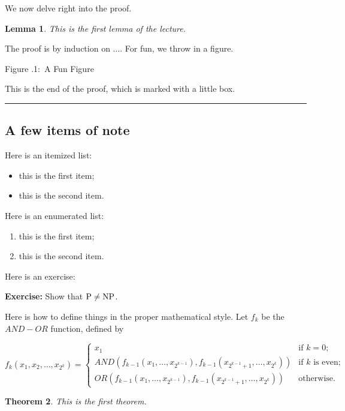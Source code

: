 \documentclass[twoside]{article}
\newcounter{lecnum}
\newcommand{\fig}[3]{
			\vspace{#2}
			\begin{center}
			Figure \thelecnum.#1:~#3
			\end{center}
	}
\newtheorem{theorem}{Theorem}[lecnum]
\newtheorem{lemma}[theorem]{Lemma}
\newenvironment{proof}{{\bf Proof:}}{\hfill\rule{2mm}{2mm}}
\begin{document}
We now delve right into the proof.

\begin{lemma}
This is the first lemma of the lecture.
\end{lemma}

\begin{proof}
The proof is by induction on $\ldots$.
For fun, we throw in a figure.
\fig{1}{1in}{A Fun Figure}

This is the end of the proof, which is marked with a little box.
\end{proof}

\subsection{A few items of note}

Here is an itemized list:
\begin{itemize}
\item this is the first item;
\item this is the second item.
\end{itemize}

Here is an enumerated list:
\begin{enumerate}
\item this is the first item;
\item this is the second item.
\end{enumerate}

Here is an exercise:

{\bf Exercise:}  Show that ${\rm P}\ne{\rm NP}$.

Here is how to define things in the proper mathematical style.
Let $f_k$ be the $AND-OR$ function, defined by

\[ f_k(x_1, x_2, \ldots, x_{2^k}) = \left\{ \begin{array}{ll}

	x_1 & \mbox{if $k = 0$;} \\

	AND(f_{k-1}(x_1, \ldots, x_{2^{k-1}}),
	   f_{k-1}(x_{2^{k-1} + 1}, \ldots, x_{2^k}))
	 & \mbox{if $k$ is even;} \\

	OR(f_{k-1}(x_1, \ldots, x_{2^{k-1}}),
	   f_{k-1}(x_{2^{k-1} + 1}, \ldots, x_{2^k}))	
	& \mbox{otherwise.} 
	\end{array}
	\right. \]

\begin{theorem}
This is the first theorem.
\end{theorem}
\end{document}

